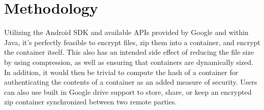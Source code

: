 \documentclass[10pt,a4paper]{article}
\begin{document}
\section{Methodology}
Utilizing the Android SDK and available APIs provided by Google and within Java, it’s perfectly feasible to encrypt files, zip them into a container, and encrypt the container itself. This also has an intended side effect of reducing the file size by using compression, as well as ensuring that containers are dynamically sized. In addition, it would then be trivial to compute the hash of a container for authenticating the contents of a container as an added measure of security. Users can also use built in Google drive support to store, share, or keep an encrypted zip container synchronized between two remote parties.
\end{document}
